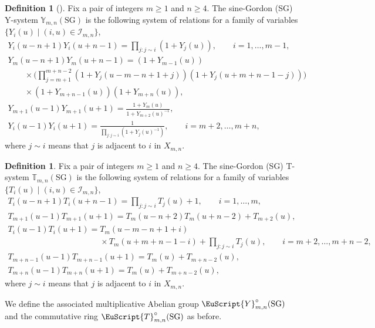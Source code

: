 \documentclass[pdftex]{sigma}
\numberwithin{equation}{section}
\theoremstyle{definition}
\newtheorem{Definition}[Theorem]{Definition}
\begin{document}
\begin{Definition}[\cite{Tateo95}]
Fix a pair of integers $m \geq 1$ and $n \geq 4$.
The sine-Gordon (SG)
Y-system $\mathbb{Y}_{m,n}(\mathrm{SG})$
is the following system of relations for
a family of variables
 $\{Y_i(u) \mid (i,u)\in \mathcal{I}_{m,n} \}$,
\begin{gather*}
Y_i(u-n+1)Y_i(u+n-1)
 =\prod_{j:j\sim i} (1+Y_j(u)),
\qquad i=1,\dots,m-1,
\nonumber\\
Y_m\left(u-n+1\right)
Y_m\left(u+n-1\right)
 = (1+Y_{m-1}(u))
\nonumber\\
\qquad {}\times
\Biggl(\prod_{j=m+1}^{m+n-2} (1+Y_j(u- m-n+1+j))
(1+Y_j(u+m+n-1-j))\Biggr)\nonumber\\
\qquad {} \times (1+Y_{m+n-1} (u))(1+Y_{m+n}(u)),
\nonumber\\
Y_{m+1}(u-1) Y_{m+1}(u+1)
=
\frac{1+Y_m(u)}{1+Y_{m+2}(u)^{-1}}
,\nonumber\\
Y_i(u-1)Y_i(u+1)
=
\frac{1}{\prod\limits_{j:j\sim i} (1+Y_j(u)^{-1})},
\qquad i=m+2,\dots,m+n,%
\end{gather*}
where $j\sim i$ means that $j$ is adjacent to $i$ in $X_{m,n}$.
\end{Definition}

\begin{Definition}
Fix a pair of integers $m \geq 1$ and $n \geq 4$.
The sine-Gordon (SG)
T-system $\mathbb{T}_{m,n}(\mathrm{SG})$
is the following system of relations for
a family of variables
 $\{T_i(u) \mid (i,u)\in \mathcal{I}_{m,n} \}$,
\begin{gather*}
T_i(u-n+1)T_i(u+n-1)
=
\prod_{j:j\sim i} T_j(u)+1,
\qquad i=1,\dots,m,\nonumber\\
T_{m+1}(u-1) T_{m+1}(u+1)
=
T_m(u-n+2)T_m(u+n-2)+T_{m+2}(u),
\nonumber\\
T_i(u-1)T_i(u+1)=T_m(u-m-n+1+i)\nonumber
\\
\phantom{T_i(u-1)T_i(u+1)=}{}\times T_m(u+m+n-1-i)
+ \!\prod_{j: j\sim i} T_j(u),\! \qquad i=m+2,\dots,m+n-2,
\nonumber\\
T_{m+n-1}(u-1)T_{m+n-1}(u+1)
=
T_m(u) + T_{m+n-2}(u),
\nonumber\\
T_{m+n}(u-1)T_{m+n}(u+1)
=
T_m(u) + T_{m+n-2}(u),%
\end{gather*}
where $j\sim i$ means that $j$ is adjacent to $i$ in $X_{m,n}$.
\end{Definition}

We def\/ine the associated multiplicative Abelian
group $\EuScript{Y}^{\circ}_{m,n}(\mathrm{SG})$
and the commutative ring
$\EuScript{T}^{\circ}_{m,n}(\mathrm{SG})$
 as before.
\end{document}
